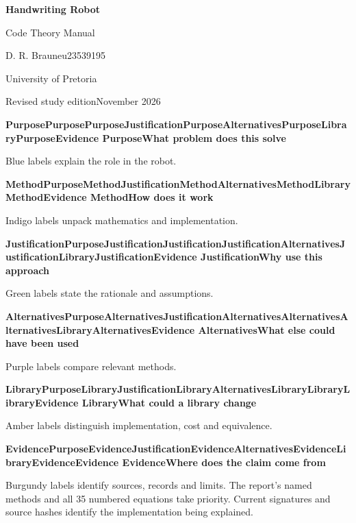 \documentclass[11pt,a4paper,oneside]{report}
\newcommand{\Q}[2]{\par\addvspace{7pt}\begingroup\sffamily\bfseries\small
\def\qt{#1}\def\pp{Purpose}\def\jj{Justification}\def\aa{Alternatives}\def\ll{Library}\def\ee{Evidence}
\ifx\qt\pp\color{purpose}\else\ifx\qt\jj\color{reason}\else\ifx\qt\aa\color{alternative}\else\ifx\qt\ll\color{library}\else\ifx\qt\ee\color{source}\else\color{method}\fi\fi\fi\fi\fi
#1\enspace\textbar\enspace #2\par\endgroup\nobreak\smallskip}
\begin{document}
\begin{titlepage}
\vspace*{1.4cm}
{\sffamily\Huge\bfseries\color{navy}Handwriting Robot\par Code Theory Manual\par}
\vspace{0.7cm}{\sffamily\Large Report methods and the current demo pipeline\par}
\vspace{1cm}D. R. Braune\quad u23539195\par University of Pretoria\par
\vspace{0.4cm}Revised study edition\quad November 2026\par
\vspace{1.1cm}
\Q{Purpose}{What problem does this solve} Blue labels explain the role in the robot.
\Q{Method}{How does it work} Indigo labels unpack mathematics and implementation.
\Q{Justification}{Why use this approach} Green labels state the rationale and assumptions.
\Q{Alternatives}{What else could have been used} Purple labels compare relevant methods.
\Q{Library}{What could a library change} Amber labels distinguish implementation, cost and equivalence.
\Q{Evidence}{Where does the claim come from} Burgundy labels identify sources, records and limits.
\vfill The report's named methods and all 35 numbered equations take priority.
Current signatures and source hashes identify the implementation being explained.
\end{titlepage}
\tableofcontents


















\end{document}
